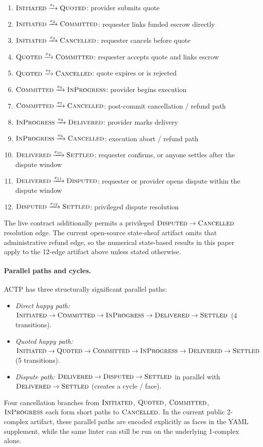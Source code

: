 \documentclass[11pt]{article}
\theoremstyle{plain}
\theoremstyle{definition}
\newcommand{\sINIT}{\textsc{Initiated}}
\newcommand{\sQUOT}{\textsc{Quoted}}
\newcommand{\sCOMM}{\textsc{Committed}}
\newcommand{\sINPROG}{\textsc{InProgress}}
\newcommand{\sDELIV}{\textsc{Delivered}}
\newcommand{\sSETTL}{\textsc{Settled}}
\newcommand{\sDISP}{\textsc{Disputed}}
\newcommand{\sCANC}{\textsc{Cancelled}}
\begin{document}
\begin{enumerate}
  \item $\sINIT \xrightarrow{e_1} \sQUOT$: provider submits quote
  \item $\sINIT \xrightarrow{e_2} \sCOMM$: requester links funded escrow directly
  \item $\sINIT \xrightarrow{e_3} \sCANC$: requester cancels before quote
  \item $\sQUOT \xrightarrow{e_4} \sCOMM$: requester accepts quote and links escrow
  \item $\sQUOT \xrightarrow{e_5} \sCANC$: quote expires or is rejected
  \item $\sCOMM \xrightarrow{e_6} \sINPROG$: provider begins execution
  \item $\sCOMM \xrightarrow{e_7} \sCANC$: post-commit cancellation / refund path
  \item $\sINPROG \xrightarrow{e_8} \sDELIV$: provider marks delivery
  \item $\sINPROG \xrightarrow{e_9} \sCANC$: execution abort / refund path
  \item $\sDELIV \xrightarrow{e_{10}} \sSETTL$: requester confirms, or anyone settles after the dispute window
  \item $\sDELIV \xrightarrow{e_{11}} \sDISP$: requester or provider opens dispute within the dispute window
  \item $\sDISP \xrightarrow{e_{12}} \sSETTL$: privileged dispute resolution
\end{enumerate}

The live contract additionally permits a privileged $\sDISP \to \sCANC$
resolution edge.  The current open-source state-sheaf artifact omits that
administrative refund edge, so the numerical state-based results in this paper
apply to the 12-edge artifact above unless stated otherwise.

\paragraph{Parallel paths and cycles.}
ACTP has three structurally significant parallel paths:
\begin{itemize}
  \item \emph{Direct happy path:} $\sINIT \to \sCOMM \to \sINPROG
        \to \sDELIV \to \sSETTL$ (4 transitions).
  \item \emph{Quoted happy path:} $\sINIT \to \sQUOT \to \sCOMM \to
        \sINPROG \to \sDELIV \to \sSETTL$ (5 transitions).
  \item \emph{Dispute path:} $\sDELIV \to \sDISP \to \sSETTL$ in parallel
        with $\sDELIV \to \sSETTL$ (creates a cycle / face).
\end{itemize}
Four cancellation branches from $\sINIT$, $\sQUOT$, $\sCOMM$, $\sINPROG$
each form short paths to $\sCANC$.  In the current public 2-complex artifact,
these parallel paths are encoded explicitly as faces in the YAML supplement,
while the same linter can still be run on the underlying 1-complex alone.
\end{document}

